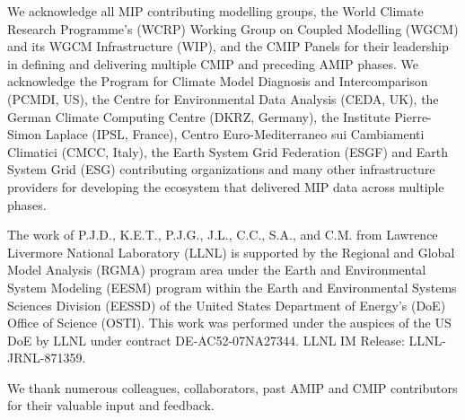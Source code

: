 \documentclass[gmd, preprint]{copernicus}
\def\cred#1{{\color{red}#1}}
\begin{document}
\begin{acknowledgements}

We acknowledge all MIP contributing modelling groups, the World Climate Research Programme's (WCRP) Working Group on Coupled Modelling (WGCM) and its WGCM Infrastructure (WIP), and the CMIP Panels for their leadership in defining and delivering multiple CMIP and preceding AMIP phases. We acknowledge the Program for Climate Model Diagnosis and Intercomparison (PCMDI, US), the Centre for Environmental Data Analysis (CEDA, UK), the German Climate Computing Centre (DKRZ, Germany), the Institute Pierre-Simon Laplace (IPSL, France), Centro Euro-Mediterraneo sui Cambiamenti Climatici (CMCC, Italy), the Earth System Grid Federation (ESGF) and Earth System Grid (ESG) contributing organizations and many other infrastructure providers for developing the ecosystem that delivered MIP data across multiple phases.

The work of P.J.D., K.E.T., P.J.G., J.L., C.C., S.A., and C.M. from Lawrence Livermore National Laboratory (LLNL) is supported by the Regional and Global Model Analysis (RGMA) program area under the Earth and Environmental System Modeling (EESM) program within the Earth and Environmental Systems Sciences Division (EESSD) of the United States Department of Energy’s (DoE) Office of Science (OSTI). This work was performed under the auspices of the US DoE by LLNL under contract DE-AC52-07NA27344. LLNL IM Release: \cred{LLNL-JRNL-871359}.

We thank numerous colleagues, collaborators, past AMIP and CMIP contributors for their valuable input and feedback.

\end{acknowledgements}







\end{document}

